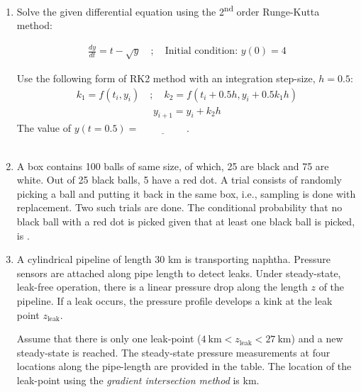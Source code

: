 \documentclass[journal,12pt,onecolumn]{IEEEtran}
\theoremstyle{remark}
\begin{document}
\begin{enumerate}
\pagebreak

\item Solve the given differential equation using the 2\textsuperscript{nd} order Runge-Kutta  method: 

\hfill{}

\begin{align*} 
\frac{dy}{dt} = t - \sqrt{y} \quad ; \quad \text{Initial condition: } y(0) = 4
\end{align*}

Use the following form of RK2 method with an integration step-size, $h = 0.5$:
\begin{align*} 
k_1 = f(t_i, y_i) \quad ; \quad k_2 = f(t_i + 0.5h, y_i + 0.5k_1 h) 
\end{align*}
\begin{align*}
y_{i+1} = y_i + k_2 h 
\end{align*}
The value of $y(t = 0.5) = \underline{\hspace{2cm}}$. \\\\

\item A box contains 100 balls of same size, of which, 25 are black and 75 are white. Out of 25 black balls, 5 have a red dot. A trial consists of randomly picking a ball and putting it back in the same box, i.e., sampling is done with replacement. Two such trials are done. The conditional probability that no black ball with a red dot is picked given that at least one black ball is picked, is \underline{\hspace{2cm}}.  

\hfill{}

\item A cylindrical pipeline of length 30 km is transporting naphtha. Pressure sensors are attached along pipe length to detect leaks. Under steady-state, leak-free operation, there is a linear pressure drop along the length $z$ of the pipeline. If a leak occurs, the pressure profile develops a kink at the leak point $z_{\text{leak}}$.


Assume that there is only one leak-point ($4~\text{km} < z_{\text{leak}} < 27~\text{km}$) and a new steady-state is reached. The steady-state pressure measurements at four locations along the pipe-length are provided in the table. The location of the leak-point using the \textit{gradient intersection method} is \underline{\hspace{2cm}} km.  


\end{enumerate}
\end{document}
